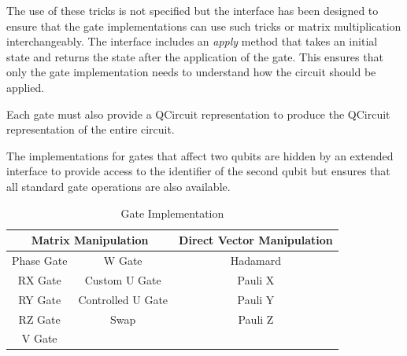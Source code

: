 The use of these tricks is not specified but the interface has been designed to ensure that the gate implementations can use such tricks or matrix multiplication interchangeably.
The interface includes an \emph{apply} method that takes an initial state and returns the state after the application of the gate.
This ensures that only the gate implementation needs to understand how the circuit should be applied.

Each gate must also provide a QCircuit \cite{QCsite} representation to produce the QCircuit representation of the entire circuit.

The implementations for gates that affect two qubits are hidden by an extended interface to provide access to the identifier of the second qubit but ensures that all standard gate operations are also available.

\begin{table}
\begin{tabular}{ | c | c || c | }
\hline
\multicolumn{2}{|c||}{\textbf{Matrix Manipulation}} & \textbf{Direct Vector Manipulation} \\ \hline
Phase Gate & W Gate &Hadamard \\ \hline
RX Gate &Custom U Gate & Pauli X \\ \hline
RY Gate &Controlled U Gate & Pauli Y \\ \hline
RZ Gate &Swap & Pauli Z \\ \hline
V Gate && \\ \hline
\end{tabular}
\caption{Gate Implementation}
\label{tab:gateimps}
\end{table}

